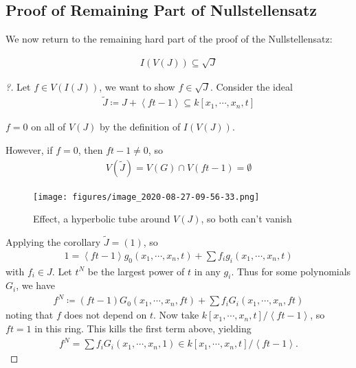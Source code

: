 \hypertarget{proof-of-remaining-part-of-nullstellensatz}{%
\subsection{Proof of Remaining Part of
Nullstellensatz}\label{proof-of-remaining-part-of-nullstellensatz}}

We now return to the remaining hard part of the proof of the
Nullstellensatz:

\begin{align*}
I(V(J)) \subseteq \sqrt{J}
\end{align*}

\begin{proof}[?]

Let \(f\in V(I(J))\), we want to show \(f\in \sqrt{J}\). Consider the
ideal
\begin{align*}
\tilde J \coloneqq J + \left\langle{ft - 1}\right\rangle \subseteq k[x_1, \cdots, x_n, t]
\end{align*}

\begin{observation}

\(f = 0\) on all of \(V(J)\) by the definition of \(I(V(J))\).

\end{observation}

However, if \(f=0\), then \(ft-1 \neq 0\), so
\begin{align*}
V(\tilde J) = V(G) \cap V(ft-1) = \emptyset
\end{align*}

\begin{figure}
\centering
\texttt{[image: figures/image\_2020-08-27-09-56-33.png]}
\caption{Effect, a hyperbolic tube around \(V(J)\), so both can't
vanish}
\end{figure}

Applying the corollary \(\tilde J = (1)\), so
\begin{align*}
1 = \left\langle{ft-1}\right\rangle g_0(x_1, \cdots, x_n, t) + \sum f_i g_i(x_1, \cdots, x_n, t)
\end{align*}
with \(f_i \in J\). Let \(t^N\) be the largest power of \(t\) in any
\(g_i\). Thus for some polynomials \(G_i\), we have
\begin{align*}  
f^N \coloneqq(ft-1) G_0(x_1, \cdots, x_n, ft) + \sum f_i G_i(x_1, \cdots, x_n, ft)
\end{align*}
noting that \(f\) does not depend on \(t\). Now take
\(k[x_1, \cdots, x_n, t]/\left\langle{ft-1}\right\rangle\), so \(ft=1\)
in this ring. This kills the first term above, yielding
\begin{align*}  
f^N = \sum f_i G_i(x_1, \cdots, x_n, 1) \in k[x_1, \cdots, x_n, t]/\left\langle{ft-1}\right\rangle
.\end{align*}


\end{proof}
